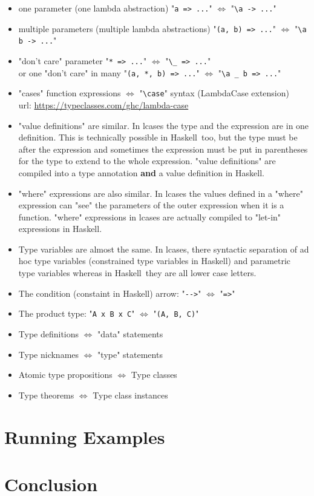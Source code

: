 \documentclass{article}
\def\H{Haskell}
\def\r{$\Longleftrightarrow$ }
\begin{document}
\begin{itemize}
\item
one parameter (one lambda abstraction) "\verb|a => ...|" \r
"\verb|\a -> ...|"

\item
multiple parameters (multiple lambda abstractions) "\verb|(a, b) => ...|" \r
"\verb|\a b -> ...|"

\item
"don't care" parameter
"\verb|* => ...|" \r "\verb|\_ => ...|"
\\
or one "don't care" in many
"\verb|(a, *, b) => ...|" \r "\verb|\a _ b => ...|"

\item
"cases" function expressions \r "\verb|\case|" syntax
(LambdaCase extension) \\
url: \url{https://typeclasses.com/ghc/lambda-case}

\item
"value definitions" are similar. In lcases the type and the expression are in
one definition. This is technically possible in \H\ too, but the type must be
after the expression and sometimes the expression must be put in parentheses
for the type to extend to the whole expression. "value definitions" are
compiled into a type annotation \textbf{and} a value definition in \H.

\item
"where" expressions are also similar. In lcases the values defined in a
"where" expression can "see" the parameters of the outer expression when
it is a function. "where" expressions in lcases are actually compiled to
"let-in" expressions in \H.

\item
Type variables are almost the same. In lcases, there syntactic separation of ad
hoc type variables (constrained type variables in \H) and parametric type
variables whereas in \H\ they are all lower case letters.

\item
The condition (constaint in \H) arrow: "\verb|-->|" \r "\verb|=>|"

\item
The product type: "\verb|A x B x C|" \r "\verb|(A, B, C)|"

\item
Type definitions \r "data" statements

\item
Type nicknames \r "type" statements

\item
Atomic type propositions \r Type classes

\item
Type theorems \r Type class instances

\end{itemize}

\section{Running Examples}

\section{Conclusion}

\newpage
\printbibliography
\end{document}
